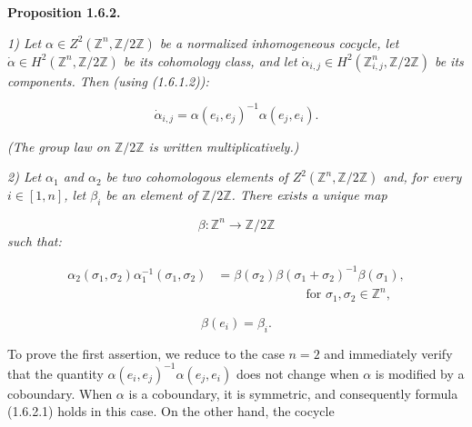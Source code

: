 %
\noindent\textbf{Proposition 1.6.2.}\quad

\noindent\emph{1) Let
$\alpha\in Z^2(\mathbb Z^n,\mathbb Z/2\mathbb Z)$ be a normalized
inhomogeneous cocycle, let
$\dot\alpha\in H^2(\mathbb Z^n,\mathbb Z/2\mathbb Z)$ be its cohomology
class, and let
$\dot\alpha_{i,j}\in H^2(\mathbb Z^n_{i,j},\mathbb Z/2\mathbb Z)$ be
its components. Then (using (1.6.1.2)):}

\begin{equation}
  \dot\alpha_{i,j}
  =\alpha(e_i,e_j)^{-1}\alpha(e_j,e_i).
  \tag{1.6.2.1}
\end{equation}

\noindent\emph{(The group law on $\mathbb Z/2\mathbb Z$ is written
multiplicatively.)}

\noindent\emph{2) Let $\alpha_1$ and $\alpha_2$ be two cohomologous
elements of $Z^2(\mathbb Z^n,\mathbb Z/2\mathbb Z)$ and, for every
$i\in[1,n]$, let $\beta_i$ be an element of $\mathbb Z/2\mathbb Z$.
There exists a unique map}

\begin{equation*}
  \beta\colon\mathbb Z^n\longrightarrow\mathbb Z/2\mathbb Z
\end{equation*}
\noindent\emph{such that:}

\begin{equation}
  \begin{aligned}
    \alpha_2(\sigma_1,\sigma_2)\alpha_1^{-1}(\sigma_1,\sigma_2)
      &=\beta(\sigma_2)\beta(\sigma_1+\sigma_2)^{-1}\beta(\sigma_1),\\[-1mm]
    &\hspace{7em}\text{for }\sigma_1,\sigma_2\in\mathbb Z^n,
  \end{aligned}
  \tag{1.6.2.2}
\end{equation}

\begin{equation}
  \beta(e_i)=\beta_i.
  \tag{1.6.2.3}
\end{equation}

To prove the first assertion, we reduce to the case $n=2$ and
immediately verify that the quantity
$\alpha(e_i,e_j)^{-1}\alpha(e_j,e_i)$ does not change when $\alpha$ is
modified by a coboundary. When $\alpha$ is a coboundary, it is
symmetric, and consequently formula (1.6.2.1) holds in this case. On
the other hand, the cocycle

